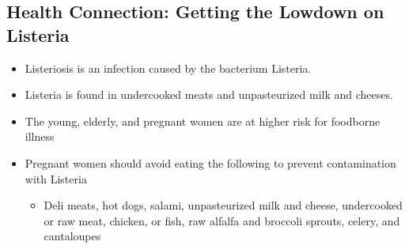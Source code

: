 \documentclass[12pt]{article}
\begin{document}
        \subsection{Health Connection: Getting the Lowdown on Listeria}
            \begin{itemize}
                \item Listeriosis is an infection caused by the bacterium Listeria.
                \item Listeria is found in undercooked meats and unpasteurized milk and cheeses.
                \item The young, elderly, and pregnant women are at higher risk for foodborne illness
                \item Pregnant women should avoid eating the following to prevent contamination with Listeria
                    \begin{itemize}
                        \item Deli meats, hot dogs, salami, unpasteurized milk and cheese, undercooked or raw meat, chicken, or fish, raw alfalfa and broccoli sprouts, celery, and cantaloupes
                    \end{itemize}
            \end{itemize}
\end{document}
